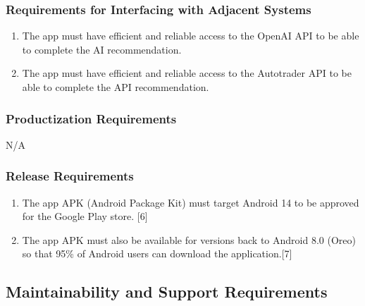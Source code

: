 \documentclass[]{article}
\begin{document}
\subsubsection{Requirements for Interfacing with Adjacent Systems}
\label{ssub:interfacing_adjacent_systems}
\begin{enumerate}[{OE-RIAS}1.]
    \item The app must have efficient and reliable access to the OpenAI API to be able to complete the AI recommendation. 
    \item The app must have efficient and reliable access to the Autotrader API to be able to complete the API recommendation.
\end{enumerate}

\subsubsection{Productization Requirements}
\label{ssub:productization_requirements}
N/A

\subsubsection{Release Requirements}
\label{ssub:release_requirements}
\begin{enumerate}[{OE-RR}1.]
    \item The app APK (Android Package Kit) must target Android 14 to be approved for the Google Play store. [6]
    \item The app APK must also be available for versions back to Android 8.0 (Oreo) so that 95\% of Android users can download the application.[7]
\end{enumerate}

\subsection{Maintainability and Support Requirements}
\label{sub:maintainability_and_support_requirements}
\end{document}
